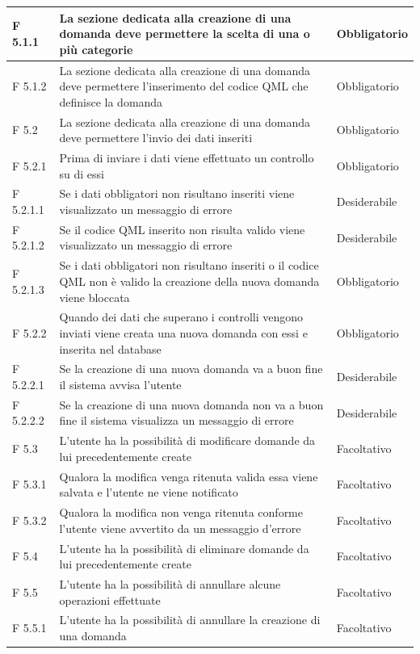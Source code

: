 \documentclass[a4paper,11pt]{article}
\begin{document}
\begin{longtable}{p{}p{}p{}}
\midrule
F 5.1.1 & La sezione dedicata alla creazione di una domanda deve permettere la scelta di una o più categorie & Obbligatorio\\
\midrule
F 5.1.2 & La sezione dedicata alla creazione di una domanda deve permettere l'inserimento del codice QML che definisce la domanda & Obbligatorio\\
\midrule
F 5.2 & La sezione dedicata alla creazione di una domanda deve permettere l'invio dei dati inseriti & Obbligatorio\\
\midrule
F 5.2.1 & Prima di inviare i dati viene effettuato un controllo su di essi & Obbligatorio\\
\midrule
F 5.2.1.1 & Se i dati obbligatori non risultano inseriti viene visualizzato un messaggio di errore & Desiderabile\\
\midrule
F 5.2.1.2 & Se il codice QML inserito non risulta valido viene visualizzato un messaggio di errore & Desiderabile\\
\midrule
F 5.2.1.3 & Se i dati obbligatori non risultano inseriti o il codice QML non è valido la creazione della nuova domanda viene bloccata & Obbligatorio\\
\midrule
F 5.2.2 & Quando dei dati che superano i controlli vengono inviati viene creata una nuova domanda con essi e inserita nel database & Obbligatorio\\
\midrule
F 5.2.2.1 & Se la creazione di una nuova domanda va a buon fine il sistema avvisa l'utente & Desiderabile\\
\midrule
F 5.2.2.2 & Se la creazione di una nuova domanda non va a buon fine il sistema visualizza un messaggio di errore & Desiderabile\\
\midrule
F 5.3 & L'utente ha la possibilità di modificare domande da lui precedentemente create & Facoltativo\\
\midrule
F 5.3.1 & Qualora la modifica venga ritenuta valida essa viene salvata e l'utente ne viene notificato & Facoltativo\\
\midrule
F 5.3.2 & Qualora la modifica non venga ritenuta conforme l'utente viene avvertito da un messaggio d'errore & Facoltativo\\
\midrule
F 5.4 & L'utente ha la possibilità di eliminare domande da lui precedentemente create & Facoltativo\\
\midrule
F 5.5 & L'utente ha la possibilità di annullare alcune operazioni effettuate & Facoltativo\\
\midrule
F 5.5.1 & L'utente ha la possibilità di annullare la creazione di una domanda & Facoltativo\\

\end{longtable}
\end{document}
